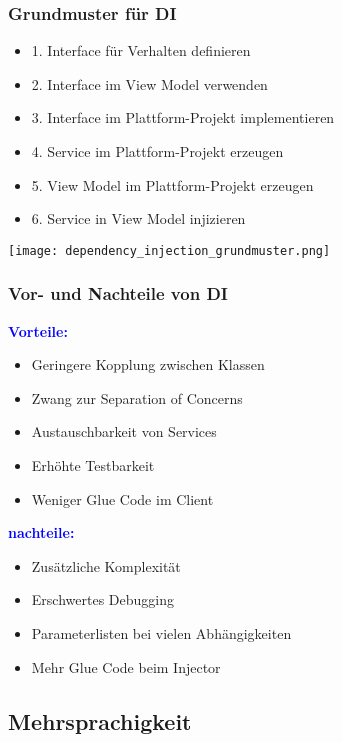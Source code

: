 \subsubsection{Grundmuster für DI}
\begin{itemize}[topsep=0pt, leftmargin=4mm]
    \setlength\itemsep{-0.3em}
    \item 1. Interface für Verhalten definieren
    \item 2. Interface im View Model verwenden
    \item 3. Interface im Plattform-Projekt implementieren
    \item 4. Service im Plattform-Projekt erzeugen
    \item 5. View Model im Plattform-Projekt erzeugen
    \item 6. Service in View Model injizieren
\end{itemize}
\begin{center}
    \texttt{[image: dependency\_injection\_grundmuster.png]}
\end{center}
\subsubsection{Vor- und Nachteile von DI}
\textbf{\textcolor{blue}{Vorteile:}}
\begin{itemize}[topsep=0pt, leftmargin=4mm]
    \setlength\itemsep{-0.3em}
    \item Geringere Kopplung zwischen Klassen
    \item Zwang zur Separation of Concerns
    \item Austauschbarkeit von Services
    \item Erhöhte Testbarkeit
    \item Weniger Glue Code im Client
\end{itemize}
\textbf{\textcolor{blue}{nachteile:}}
\begin{itemize}[topsep=0pt, leftmargin=4mm]
    \setlength\itemsep{-0.3em}
    \item Zusätzliche Komplexität
    \item Erschwertes Debugging
    \item Parameterlisten bei vielen Abhängigkeiten
    \item Mehr Glue Code beim Injector
\end{itemize}
\subsection{Mehrsprachigkeit}
